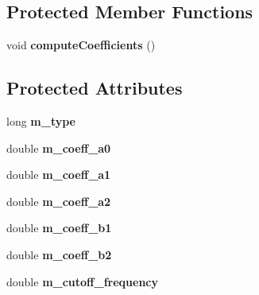 \subsection*{Protected Member Functions}
\begin{DoxyCompactItemize}
\item 
\hypertarget{class_filter_biquad_a7a49066ab883f97d60e296d00a9962a6}{void {\bfseries compute\-Coefficients} ()}\label{class_filter_biquad_a7a49066ab883f97d60e296d00a9962a6}

\end{DoxyCompactItemize}
\subsection*{Protected Attributes}
\begin{DoxyCompactItemize}
\item 
\hypertarget{class_filter_biquad_aa6791ad0efb77096df22d29974632fc1}{long {\bfseries m\-\_\-type}}\label{class_filter_biquad_aa6791ad0efb77096df22d29974632fc1}

\item 
\hypertarget{class_filter_biquad_af9a7e97b119850e882e2ea2594be3703}{double {\bfseries m\-\_\-coeff\-\_\-a0}}\label{class_filter_biquad_af9a7e97b119850e882e2ea2594be3703}

\item 
\hypertarget{class_filter_biquad_a4cfdfe885b474412a15aa491233626cd}{double {\bfseries m\-\_\-coeff\-\_\-a1}}\label{class_filter_biquad_a4cfdfe885b474412a15aa491233626cd}

\item 
\hypertarget{class_filter_biquad_a13acea509e092cbfde73f4d889e83287}{double {\bfseries m\-\_\-coeff\-\_\-a2}}\label{class_filter_biquad_a13acea509e092cbfde73f4d889e83287}

\item 
\hypertarget{class_filter_biquad_ae8eae9e9c411c7346b6baa081d0f9dda}{double {\bfseries m\-\_\-coeff\-\_\-b1}}\label{class_filter_biquad_ae8eae9e9c411c7346b6baa081d0f9dda}

\item 
\hypertarget{class_filter_biquad_a22780741118959d2e682e98aa4f6f131}{double {\bfseries m\-\_\-coeff\-\_\-b2}}\label{class_filter_biquad_a22780741118959d2e682e98aa4f6f131}

\item 
\hypertarget{class_filter_biquad_a75bb61b7d4f646bf9f2af05fff82d65c}{double {\bfseries m\-\_\-cutoff\-\_\-frequency}}\label{class_filter_biquad_a75bb61b7d4f646bf9f2af05fff82d65c}


\end{DoxyCompactItemize}
